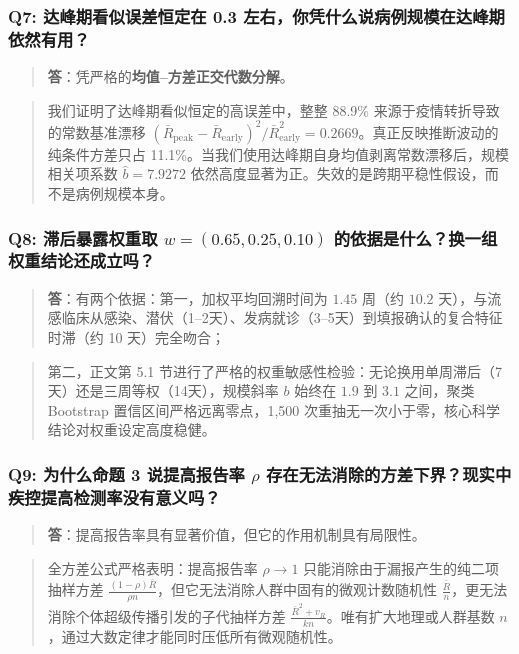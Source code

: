 \documentclass[11pt,a4paper]{ctexart}
\begin{document}
\subsubsection{Q7: 达峰期看似误差恒定在 0.3 左右，你凭什么说病例规模在达峰期依然有用？}
\begin{quote}\small\color{black!75}
\textbf{答}：凭严格的\textbf{均值--方差正交代数分解}。
\end{quote}
\begin{quote}\small\color{black!75}
我们证明了达峰期看似恒定的高误差中，整整 88.9\% 来源于疫情转折导致的常数基准漂移 $(\bar{R}_{\mathrm{peak}} - \bar{R}_{\mathrm{early}})^2 / \bar{R}_{\mathrm{early}}^2 = 0.2669$。真正反映推断波动的纯条件方差只占 11.1\%。当我们使用达峰期自身均值剥离常数漂移后，规模相关项系数 $\hat{b} = 7.9272$ 依然高度显著为正。失效的是跨期平稳性假设，而不是病例规模本身。
\end{quote}

\subsubsection{Q8: 滞后暴露权重取 $w = (0.65, 0.25, 0.10)$ 的依据是什么？换一组权重结论还成立吗？}
\begin{quote}\small\color{black!75}
\textbf{答}：有两个依据：第一，加权平均回溯时间为 $1.45$ 周（约 $10.2$ 天），与流感临床从感染、潜伏（1–2天）、发病就诊（3–5天）到填报确认的复合特征时滞（约 10 天）完全吻合；
\end{quote}
\begin{quote}\small\color{black!75}
第二，正文第 5.1 节进行了严格的权重敏感性检验：无论换用单周滞后（7天）还是三周等权（14天），规模斜率 $b$ 始终在 $1.9$ 到 $3.1$ 之间，聚类 Bootstrap 置信区间严格远离零点，1,500 次重抽无一次小于零，核心科学结论对权重设定高度稳健。
\end{quote}

\subsubsection{Q9: 为什么命题 3 说提高报告率 $\rho$ 存在无法消除的方差下界？现实中疾控提高检测率没有意义吗？}
\begin{quote}\small\color{black!75}
\textbf{答}：提高报告率具有显著价值，但它的作用机制具有局限性。
\end{quote}
\begin{quote}\small\color{black!75}
全方差公式严格表明：提高报告率 $\rho \to 1$ 只能消除由于漏报产生的纯二项抽样方差 $\frac{(1-\rho)\bar{R}}{\rho n}$，但它无法消除人群中固有的微观计数随机性 $\frac{\bar{R}}{n}$，更无法消除个体超级传播引发的子代抽样方差 $\frac{\bar{R}^2+v_R}{kn}$。唯有扩大地理或人群基数 $n$，通过大数定律才能同时压低所有微观随机性。
\end{quote}
\end{document}
